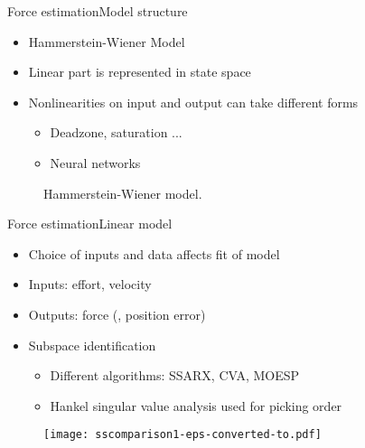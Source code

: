 \begin{frame}{Force estimation}{Model structure}

  \begin{itemize}
      \item Hammerstein-Wiener Model
	  \item Linear part is represented in state space
	  \item Nonlinearities on input and output can take different forms
	  \begin{itemize}
	  \item Deadzone, saturation ...
	  \item Neural networks
	  \end{itemize}
  \end{itemize}

\vspace{3em}
\begin{figure}[H]
\caption{Hammerstein-Wiener model.}
\label{weiner}
\end{figure}



\end{frame}




\begin{frame}{Force estimation}{Linear model}
\begin{itemize}
  \item Choice of inputs and data affects fit of model
  \item Inputs: effort, velocity 
  \item Outputs: force (, position error)
  \item Subspace identification
	\begin{itemize}
	\item Different algorithms: SSARX, CVA, MOESP
	\item Hankel singular value analysis used for picking order
	\end{itemize}
\end{itemize}
	
	\begin{figure}
	\centering
	\texttt{[image: sscomparison1-eps-converted-to.pdf]}
	\end{figure}
\end{frame}

